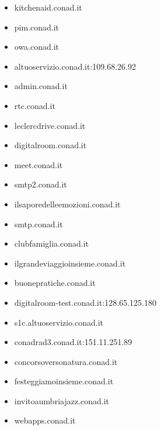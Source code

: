 \documentclass{article}
\begin{document}
\begin{itemize}
        \item kitchenaid.conad.it
    
        \item pim.conad.it
    
        \item owa.conad.it
    
        \item altuoservizio.conad.it:109.68.26.92
    
        \item admin.conad.it
    
        \item rtc.conad.it
    
        \item leclercdrive.conad.it
    
        \item digitalroom.conad.it
    
        \item meet.conad.it
    
        \item smtp2.conad.it
    
        \item ilsaporedelleemozioni.conad.it
    
        \item smtp.conad.it
    
        \item clubfamiglia.conad.it
    
        \item ilgrandeviaggioinsieme.conad.it
    
        \item buonepratiche.conad.it
    
        \item digitalroom-test.conad.it:128.65.125.180
    
        \item s1c.altuoservizio.conad.it
    
        \item conadrad3.conad.it:151.11.251.89
    
        \item concorsoversonatura.conad.it
    
        \item festeggiamoinsieme.conad.it
    
        \item invitoaumbriajazz.conad.it
    
        \item webapps.conad.it
    

\end{itemize}
\end{document}
